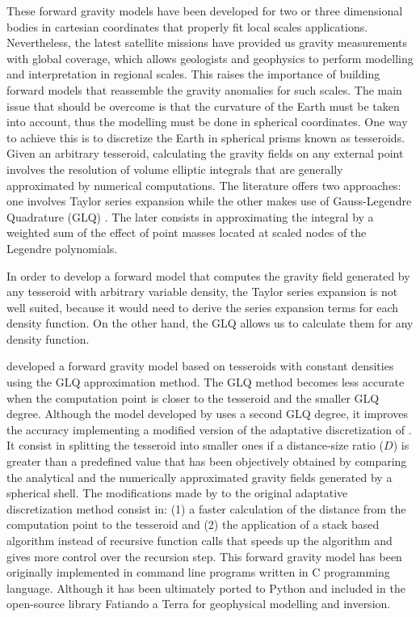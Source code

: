 \documentclass[extra]{gji}
\begin{document}
These forward gravity models have been developed for two or three dimensional bodies in cartesian coordinates that properly fit local scales applications.
Nevertheless, the latest satellite missions have provided us gravity measurements with global coverage, which allows geologists and geophysics to perform modelling and interpretation in regional scales.
This raises the importance of building forward models that reassemble the gravity anomalies for such scales. The main issue that should be overcome is that the curvature of the Earth must be taken into account, thus the modelling must be done in spherical coordinates.
One way to achieve this is to discretize the Earth in spherical prisms known as tesseroids. 
Given an arbitrary tesseroid, calculating the gravity fields on any external point involves the resolution of volume elliptic integrals  that are generally approximated by numerical computations.
The literature offers two approaches: one involves Taylor series expansion  while the other makes use of Gauss-Legendre Quadrature (GLQ) . The later consists in approximating the integral by a weighted sum of the effect of point masses located at scaled nodes of the Legendre polynomials.

In order to develop a forward model that computes the gravity field generated by any tesseroid with arbitrary variable density, the Taylor series expansion is not well suited, because it would need to derive the series expansion terms for each density function. On the other hand, the GLQ allows us to calculate them for any density function.

\citet{Uieda2016} developed a forward gravity model based on tesseroids with constant densities using the GLQ approximation method.
The GLQ method becomes less accurate when the computation point is closer to the tesseroid  and the smaller GLQ degree. 
Although the model developed by \citet{Uieda2016} uses a second GLQ degree, it improves the accuracy implementing a modified version of the adaptative discretization of \citet{Li2011}.
It consist in splitting the tesseroid into smaller ones if a distance-size ratio ($D$) is greater than a predefined value that has been objectively obtained by \citet{Uieda2016} comparing the analytical and the numerically approximated gravity fields generated by a spherical shell.
The modifications made by \citet{Uieda2016} to the original adaptative discretization method \citep{Li2011} consist in:
(1) a faster calculation of the distance from the computation point to the tesseroid and 
(2) the application of a stack based algorithm instead of recursive function calls that  speeds up the algorithm and gives more control over the recursion step.
This forward gravity model has been originally implemented in command line programs written in C programming language. Although it has been ultimately ported to Python and included in the open-source library Fatiando a Terra  for geophysical modelling and inversion.
\end{document}
